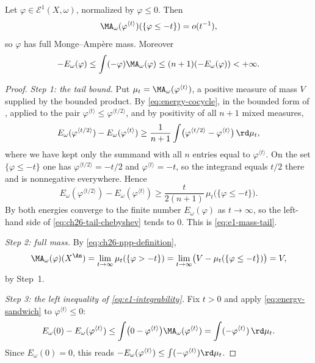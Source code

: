 \begin{proposition}\label{prop:e1-integrability-tail}
Let \(\varphi\in\mathcal E^1(X,\omega)\), normalized by \(\varphi\leq0\).
Then
\begin{equation}
\label{eq:e1-mass-tail}
 \MA_\omega(\varphi^{\langle t\rangle})
       (\{\varphi\leq-t\})=o(t^{-1}),
\end{equation}
so \(\varphi\) has full Monge--Amp\`ere mass. Moreover
\begin{equation}
\label{eq:e1-integrability}
 -E_\omega(\varphi)
 \leq\int(-\varphi)\MA_\omega(\varphi)
 \leq(n+1)(-E_\omega(\varphi))<+\infty.
\end{equation}
\end{proposition}

\begin{proof}
\emph{Step 1: the tail bound.}  Put
\(\mu_t=\MA_\omega(\varphi^{\langle t\rangle})\), a positive measure of mass
\(V\) supplied by the bounded product.  By
\eqref{eq:energy-cocycle}, in the bounded form of
, applied to the pair
\(\varphi^{\langle t\rangle}\leq\varphi^{\langle t/2\rangle}\), and by
positivity of all \(n+1\) mixed measures,
\[
 E_\omega(\varphi^{\langle t/2\rangle})
 -E_\omega(\varphi^{\langle t\rangle})
 \geq\frac1{n+1}
 \int\bigl(\varphi^{\langle t/2\rangle}
          -\varphi^{\langle t\rangle}\bigr)\,\rd \mu_t ,
\]
where we have kept only the summand with all \(n\) entries equal to
\(\varphi^{\langle t\rangle}\).  On the set \(\{\varphi\leq-t\}\) one has
\(\varphi^{\langle t/2\rangle}=-t/2\) and
\(\varphi^{\langle t\rangle}=-t\), so the integrand equals \(t/2\) there and
is nonnegative everywhere.  Hence
\begin{equation}
\label{eq:ch26-tail-chebyshev}
 E_\omega(\varphi^{\langle t/2\rangle})
 -E_\omega(\varphi^{\langle t\rangle})
 \geq\frac{t}{2(n+1)}\,\mu_t\bigl(\{\varphi\leq-t\}\bigr).
\end{equation}
By  both energies converge to the finite
number \(E_\omega(\varphi)\) as \(t\to\infty\), so the left-hand side of
\eqref{eq:ch26-tail-chebyshev} tends to \(0\).  This is
\eqref{eq:e1-mass-tail}.

\emph{Step 2: full mass.}  By \eqref{eq:ch26-npp-definition},
\[
 \MA_\omega(\varphi)(X^{\An})
 =\lim_{t\to\infty}\mu_t(\{\varphi>-t\})
 =\lim_{t\to\infty}\bigl(V-\mu_t(\{\varphi\leq-t\})\bigr)=V,
\]
by Step~1.

\emph{Step 3: the left inequality of \eqref{eq:e1-integrability}.}  Fix
\(t>0\) and apply \eqref{eq:energy-sandwich} to
\(\varphi^{\langle t\rangle}\leq0\):
\[
 E_\omega(0)-E_\omega(\varphi^{\langle t\rangle})
 \leq\int\bigl(0-\varphi^{\langle t\rangle}\bigr)
      \MA_\omega(\varphi^{\langle t\rangle})
 =\int(-\varphi^{\langle t\rangle})\,\rd\mu_t .
\]
Since \(E_\omega(0)=0\), this reads
\(-E_\omega(\varphi^{\langle t\rangle})\leq\int(-\varphi^{\langle
t\rangle})\rd\mu_t\).


\end{proof}
